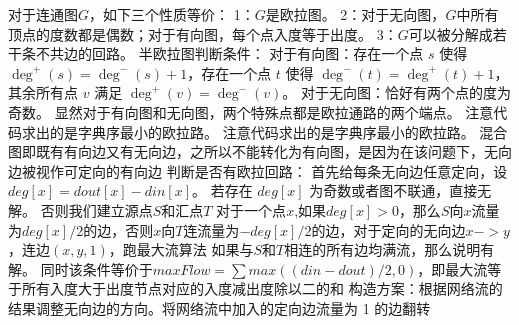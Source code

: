 {}对于连通图$ G $，如下三个性质等价：\markdownRendererParagraphSeparator
{}1：$ G $是欧拉图。\markdownRendererParagraphSeparator
{}2：对于无向图，$ G $中所有顶点的度数都是偶数；对于有向图，每个点入度等于出度。\markdownRendererParagraphSeparator
{}3：$ G $可以被分解成若干条不共边的回路。\markdownRendererParagraphSeparator
{}半欧拉图判断条件：\markdownRendererParagraphSeparator
{}对于有向图：存在一个点 $s$ 使得 $\deg^{+}(s)=\deg^{-}(s)+1$，存在一个点 $t$ 使得 $\deg^{-}(t)=\deg^{+}(t)+1$，其余所有点 $v$ 满足 $\deg^{+}(v)=\deg^{-}(v)$。\markdownRendererParagraphSeparator
{}对于无向图：恰好有两个点的度为奇数。\markdownRendererParagraphSeparator
{}显然对于有向图和无向图，两个特殊点都是欧拉通路的两个端点。\markdownRendererInterblockSeparator
{}\markdownRendererSectionBegin
{}\markdownRendererInterblockSeparator
{}注意代码求出的是字典序最小的欧拉路。\markdownRendererInterblockSeparator
{}\markdownRendererInterblockSeparator
{}
\markdownRendererSectionEnd \markdownRendererSectionBegin
{}\markdownRendererInterblockSeparator
{}注意代码求出的是字典序最小的欧拉路。\markdownRendererInterblockSeparator
{}\markdownRendererInterblockSeparator
{}
\markdownRendererSectionEnd \markdownRendererSectionBegin
{}\markdownRendererInterblockSeparator
{}混合图即既有有向边又有无向边，之所以不能转化为有向图，是因为在该问题下，无向边被视作可定向的有向边\markdownRendererParagraphSeparator
{}判断是否有欧拉回路：\markdownRendererParagraphSeparator
{}首先给每条无向边任意定向，设 $deg[x] = dout[x] - din[x]$。\markdownRendererParagraphSeparator
{}若存在 $deg[x]$ 为奇数或者图不联通，直接无解。\markdownRendererParagraphSeparator
{}否则我们建立源点$ S $和汇点$ T $\markdownRendererParagraphSeparator
{}对于一个点$ x $,如果$ deg[x]>0 $，那么$ S $向$ x $流量为$ deg[x]/2 $的边，否则$ x $向$ T $连流量为$ -deg[x]/2 $的边，对于定向的无向边$ x->y $，连边$ (x,y,1) $，跑最大流算法\markdownRendererParagraphSeparator
{}如果与$ S $和$ T $相连的所有边均满流，那么说明有解。\markdownRendererParagraphSeparator
{}同时该条件等价于$ maxFlow=\sum max((din-dout)/2,0) $，即最大流等于所有入度大于出度节点对应的入度减出度除以二的和\markdownRendererParagraphSeparator
{}构造方案：根据网络流的结果调整无向边的方向。将网络流中加入的定向边流量为 1 的边翻转\markdownRendererInterblockSeparator
